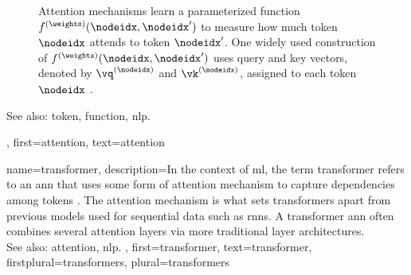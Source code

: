 {{\begin{figure}[H]
		\caption{Attention mechanisms learn a parameterized \gls{function} $f^{(\weights)}(\nodeidx,\nodeidx')$ to measure 
			how much \gls{token} $\nodeidx$ attends to \gls{token} $\nodeidx'$. 
			One widely used construction of $f^{(\weights)}(\nodeidx,\nodeidx')$ 
			uses query and key \glspl{vector}, denoted by $\vq^{(\nodeidx)}$ and $\vk^{(\nodeidx)}$, assigned to each 
			\gls{token} $\nodeidx$ \cite{vaswani2017attention}. \label{fig_attention_dict}}
		\end{figure}
		See also: \gls{token}, \gls{function}, \gls{nlp}.},
	first={attention},
	text={attention}
}

{name={transformer},
	description={In the context of \gls{ml}, the term transformer 
 		refers to an \gls{ann} that uses some form of \gls{attention} mechanism 
 		to capture dependencies among \glspl{token} \cite{vaswani2017attention}. 
 		The \gls{attention} mechanism is what sets transformers apart from 
		previous \glspl{model} used for sequential \gls{data} such as \glspl{rnn}. 
		A transformer \gls{ann} often combines several \gls{attention} \glspl{layer} 
		via more traditional \gls{layer} architectures. 
		\\ 
		See also: \gls{attention}, \gls{nlp}. }, 
 	first={transformer}, 
 	text={transformer},
 	firstplural={transformers}, 
 	plural={transformers}
}

